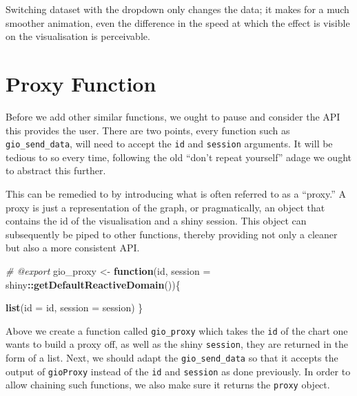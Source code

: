 \documentclass[
  10pt,
]{krantz}
\makeatletter
\newenvironment{Shaded}{\begin{snugshade}}{\end{snugshade}}
\newcommand{\CommentTok}[1]{\textcolor[rgb]{0.37,0.37,0.37}{\textit{#1}}}
\newcommand{\ControlFlowTok}[1]{\textcolor[rgb]{0.27,0.27,0.27}{\textbf{#1}}}
\newcommand{\DataTypeTok}[1]{\textcolor[rgb]{0.27,0.27,0.27}{#1}}
\newcommand{\DecValTok}[1]{\textcolor[rgb]{0.06,0.06,0.06}{#1}}
\newcommand{\KeywordTok}[1]{\textcolor[rgb]{0.27,0.27,0.27}{\textbf{#1}}}
\newcommand{\NormalTok}[1]{#1}
\newcommand{\OperatorTok}[1]{\textcolor[rgb]{0.43,0.43,0.43}{\textbf{#1}}}
\newcommand{\StringTok}[1]{\textcolor[rgb]{0.5,0.5,0.5}{#1}}
\newenvironment{kframe}{%
\medskip{}
\setlength{\fboxsep}{.8em}
 \def\at@end@of@kframe{}%
 \ifinner\ifhmode%
  \def\at@end@of@kframe{\end{minipage}}%
  \begin{minipage}{\columnwidth}%
 \fi\fi%
 \def\FrameCommand##1{\hskip\@totalleftmargin \hskip-\fboxsep
 \colorbox{shadecolor}{##1}\hskip-\fboxsep
     \hskip-\linewidth \hskip-\@totalleftmargin \hskip\columnwidth}%
 \MakeFramed {\advance\hsize-\width
   \@totalleftmargin\z@ \linewidth\hsize
   \@setminipage}}%
 {\par\unskip\endMakeFramed%
 \at@end@of@kframe}
\renewenvironment{Shaded}{\begin{kframe}}{\end{kframe}}
\makeatother
\begin{document}
Switching dataset with the dropdown only changes the data; it makes for a much smoother animation, even the difference in the speed at which the effect is visible on the visualisation is perceivable.

\hypertarget{shiny-widgets-proxy}{%
\section{Proxy Function}\label{shiny-widgets-proxy}}

Before we add other similar functions, we ought to pause and consider the API this provides the user. There are two points, every function such as \texttt{gio\_send\_data}, will need to accept the \texttt{id} and \texttt{session} arguments. It will be tedious to so every time, following the old ``don't repeat yourself'' adage we ought to abstract this further.

This can be remedied to by introducing what is often referred to as a ``proxy.'' A proxy is just a representation of the graph, or pragmatically, an object that contains the id of the visualisation and a shiny session. This object can subsequently be piped to other functions, thereby providing not only a cleaner but also a more consistent API.

\begin{Shaded}
\begin{Highlighting}[]
\CommentTok{\#\textquotesingle{} @export}
\NormalTok{gio\_proxy <{-}}\StringTok{ }\ControlFlowTok{function}\NormalTok{(id, }
  \DataTypeTok{session =}\NormalTok{ shiny}\OperatorTok{::}\KeywordTok{getDefaultReactiveDomain}\NormalTok{())\{}

  \KeywordTok{list}\NormalTok{(}\DataTypeTok{id =}\NormalTok{ id, }\DataTypeTok{session =}\NormalTok{ session)}
\NormalTok{\}}
\end{Highlighting}
\end{Shaded}

Above we create a function called \texttt{gio\_proxy} which takes the \texttt{id} of the chart one wants to build a proxy off, as well as the shiny \texttt{session}, they are returned in the form of a list. Next, we should adapt the \texttt{gio\_send\_data} so that it accepts the output of \texttt{gioProxy} instead of the \texttt{id} and \texttt{session} as done previously. In order to allow chaining such functions, we also make sure it returns the \texttt{proxy} object.

\begin{Shaded}
\end{Shaded}
\end{document}
